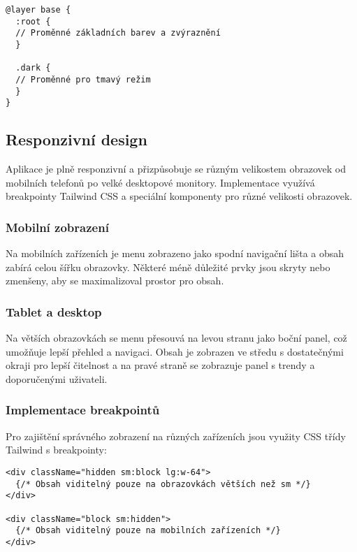 \documentclass[12pt]{article}
\begin{document}
\begin{verbatim}
@layer base {
  :root {
  // Proměnné základních barev a zvýraznění
  }

  .dark {
  // Proměnné pro tmavý režim
  }
}
\end{verbatim}

\subsection{Responzivní design}

Aplikace je plně responzivní a přizpůsobuje se různým velikostem obrazovek od mobilních telefonů po velké desktopové monitory. Implementace využívá breakpointy Tailwind CSS \citep{TailwindCSS} a speciální komponenty pro různé velikosti obrazovek.

\subsubsection{Mobilní zobrazení}

Na mobilních zařízeních je menu zobrazeno jako spodní navigační lišta a obsah zabírá celou šířku obrazovky. Některé méně důležité prvky jsou skryty nebo zmenšeny, aby se maximalizoval prostor pro obsah.

\subsubsection{Tablet a desktop}

Na větších obrazovkách se menu přesouvá na levou stranu jako boční panel, což umožňuje lepší přehled a navigaci. Obsah je zobrazen ve středu s dostatečnými okraji pro lepší čitelnost a na pravé straně se zobrazuje panel s trendy a doporučenými uživateli.

\newpage
\subsubsection{Implementace breakpointů}

Pro zajištění správného zobrazení na různých zařízeních jsou využity CSS třídy Tailwind s breakpointy:

\begin{lstlisting}[style=typescript]
<div className="hidden sm:block lg:w-64">
  {/* Obsah viditelný pouze na obrazovkách větších než sm */}
</div>

<div className="block sm:hidden">
  {/* Obsah viditelný pouze na mobilních zařízeních */}
</div>
\end{lstlisting}
\end{document}
